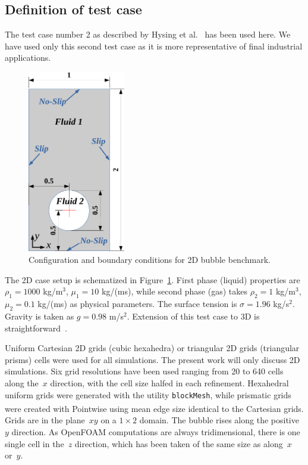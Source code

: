 \documentclass[review]{elsarticle}
\begin{document}
\subsection{Definition of test case}\label{sec_hysingcasedef}
The test case number 2 as described by Hysing et al.~\cite{Hysing2009} has been used here. We have used only this second test case as it is more representative of final industrial applications. 
\begin{figure}[!h]
\begin{center}
 \vspace{-1mm}
 \includegraphics[width=4.25cm]{figures/benchmark_scheme.pdf}
 \vspace{-7mm}
\end{center}
\caption{Configuration and boundary conditions for 2D bubble benchmark.}
\label{benchmark_scheme}
\end{figure}
The 2D case setup is schematized in Figure~\ref{benchmark_scheme}. First phase (liquid) properties are $\rho_1=1000$ kg/m$^3$, $\mu_1=10$ kg/(ms), while second phase (gas) takes $\rho_2=1$ kg/m$^3$, $\mu_2=0.1$ kg/(ms) as physical parameters. The surface tension is $\sigma=1.96$ kg/s$^2$. Gravity is taken as $g=0.98$ m/s$^2$. Extension of this test case to 3D is straightforward~\cite{Adelsberger2014}.

Uniform Cartesian 2D grids (cubic hexahedra) or triangular 2D grids (triangular prisms) cells were used for all simulations. The present work will only discuss 2D simulations. Six grid resolutions have been used ranging from 20 to 640 cells along the~$x$ direction, with the cell size halfed in each refinement. Hexahedral uniform grids were generated with the utility \verb+blockMesh+, while prismatic grids were created with Pointwise\textsuperscript{\textregistered} using mean edge size identical to the Cartesian grids. Grids are in the plane~$xy$ on a $1\times 2$ domain. The bubble rises along the positive~$y$ direction. As OpenFOAM computations are always tridimensional, there is one single cell in the~$z$ direction, which has been taken of the same size as along~$x$ or~$y$.
\end{document}
